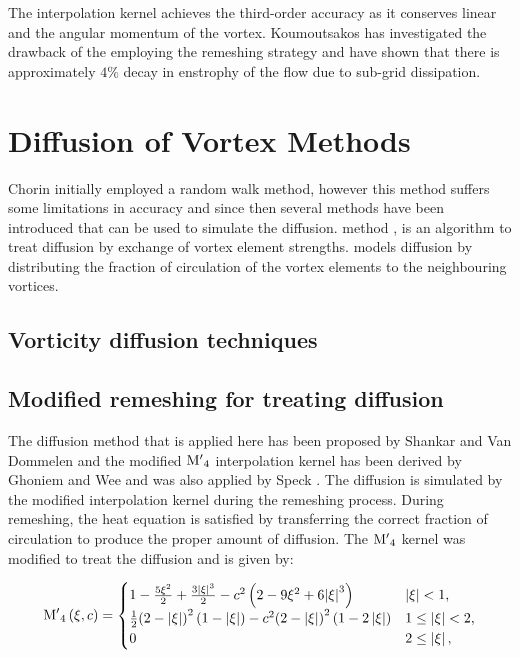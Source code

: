 The interpolation kernel achieves the third-order accuracy as it conserves linear and the angular momentum of the vortex. Koumoutsakos \cite{Koumoutsakos1997} has investigated the drawback of the employing the remeshing strategy and have shown that there is approximately $4\%$ decay in enstrophy of the flow due to sub-grid dissipation. 

\section{Diffusion of Vortex Methods}
\label{sec:diffusionVM}

Chorin initially employed a random walk method, however this method suffers some limitations in accuracy and since then several methods have been introduced that can be used to simulate the diffusion.  method \cite{Degond1989}, is an algorithm to treat diffusion by exchange of vortex element strengths.  \cite{Shankar1996} models diffusion by distributing the fraction of circulation of the vortex elements to the neighbouring vortices. 

\subsection{Vorticity diffusion techniques}
%
\subsection{Modified remeshing for treating diffusion}
The diffusion method that is applied here has been proposed by Shankar and Van Dommelen \cite{Shankar1996} and the modified ${{{\rm{M'}}}_4}$ interpolation kernel has been derived by Ghoniem and Wee \cite{Wee2006} and was also applied by Speck \cite{Speck2011}. The diffusion is simulated by the modified interpolation kernel during the remeshing process. During remeshing, the heat equation is satisfied by transferring the correct fraction of circulation to produce the proper amount of diffusion. The ${{{\rm{M'}}}_4}$ kernel was modified to treat the diffusion and is given by: 

\begin{equation}
{{{\rm{M'}}}_4}\left( {\xi ,c} \right) =
  \begin{cases}
   {1 - \frac{{5{\xi ^2}}}{2} + \frac{{3{{\left| \xi  \right|}^3}}}{2} - {c^2}\left( {2 - 9{\xi ^2} + 6{{\left| \xi  \right|}^3}} \right)} & {\left| \xi \right|} < 1, \\
   \frac{1}{2}{\left( {2 - \left| \xi  \right|} \right)^2}\left( {1 - \left| \xi  \right|} \right) - {c^2}{\left( {2 - \left| \xi  \right|} \right)^2}\left( {1 - 2\left| \xi  \right|} \right) & 1 \le {\left| \xi \right|} < 2,\\
   0 & 2 \le \left| \xi \right|,
  \end{cases}
\label{eq:modInterpKernel}
\end{equation}

